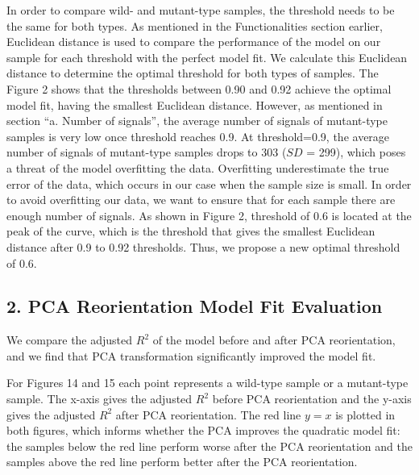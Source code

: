 \documentclass[10pt,letterpaper]{article}
\begin{document}
In order to compare wild- and mutant-type samples, the threshold needs
to be the same for both types. As mentioned in the Functionalities
section earlier, Euclidean distance is used to compare the performance
of the model on our sample for each threshold with the perfect model
fit. We calculate this Euclidean distance to determine the optimal
threshold for both types of samples. The Figure 2 shows that the
thresholds between 0.90 and 0.92 achieve the optimal model fit, having
the smallest Euclidean distance. However, as mentioned in section ``a.
Number of signals'', the average number of signals of mutant-type
samples is very low once threshold reaches 0.9. At threshold=0.9, the
average number of signals of mutant-type samples drops to 303 (\(SD\) =
299), which poses a threat of the model overfitting the data.
Overfitting underestimate the true error of the data, which occurs in
our case when the sample size is small. In order to avoid overfitting
our data, we want to ensure that for each sample there are enough number
of signals. As shown in Figure 2, threshold of 0.6 is located at the
peak of the curve, which is the threshold that gives the smallest
Euclidean distance after 0.9 to 0.92 thresholds. Thus, we propose a new
optimal threshold of 0.6.

\hypertarget{pca-reorientation-model-fit-evaluation}{%
\subsection{2. PCA Reorientation Model Fit
Evaluation}\label{pca-reorientation-model-fit-evaluation}}

We compare the adjusted \(R^2\) of the model before and after PCA
reorientation, and we find that PCA transformation significantly
improved the model fit.

For Figures 14 and 15 each point represents a wild-type sample or a
mutant-type sample. The x-axis gives the adjusted \(R^2\) before PCA
reorientation and the y-axis gives the adjusted \(R^2\) after PCA
reorientation. The red line \(y=x\) is plotted in both figures, which
informs whether the PCA improves the quadratic model fit: the samples
below the red line perform worse after the PCA reorientation and the
samples above the red line perform better after the PCA reorientation.
\end{document}
